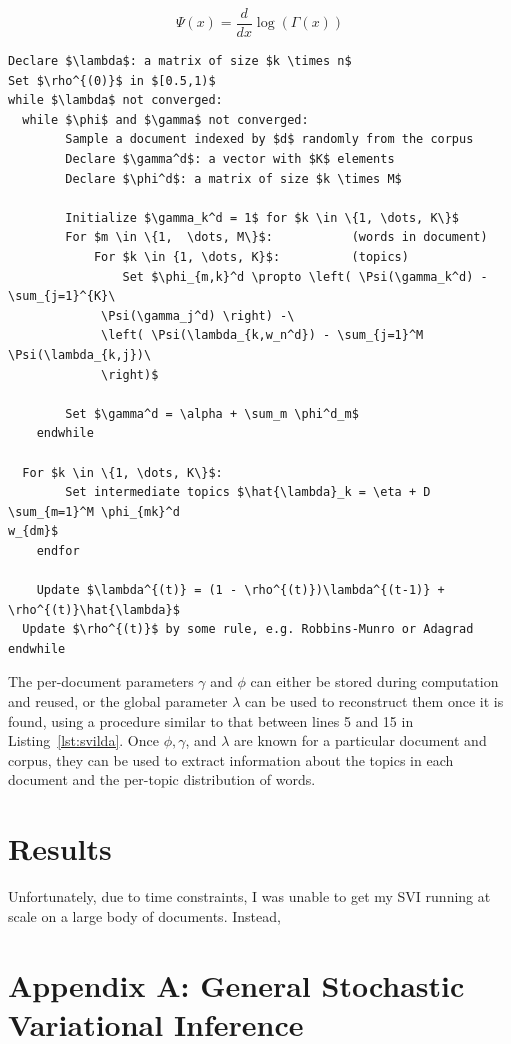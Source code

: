 \documentclass{article}
\begin{document}
\[
  \Psi(x) = \frac{d}{dx} \log \left( \Gamma(x) \right)
\]

\begin{lstlisting}[caption={The SVI-LDA algorithm},label={lst:svilda},
mathescape=true, keywords={}]
Declare $\lambda$: a matrix of size $k \times n$
Set $\rho^{(0)}$ in $[0.5,1)$
while $\lambda$ not converged:
  while $\phi$ and $\gamma$ not converged:
		Sample a document indexed by $d$ randomly from the corpus
		Declare $\gamma^d$: a vector with $K$ elements
		Declare $\phi^d$: a matrix of size $k \times M$

		Initialize $\gamma_k^d = 1$ for $k \in \{1, \dots, K\}$
		For $m \in \{1,  \dots, M\}$: 			(words in document)
			For $k \in {1, \dots, K}$: 			(topics)
				Set $\phi_{m,k}^d \propto \left( \Psi(\gamma_k^d) - \sum_{j=1}^{K}\
             \Psi(\gamma_j^d) \right) -\
             \left( \Psi(\lambda_{k,w_n^d}) - \sum_{j=1}^M \Psi(\lambda_{k,j})\
             \right)$
		
		Set $\gamma^d = \alpha + \sum_m \phi^d_m$
	endwhile

  For $k \in \{1, \dots, K\}$:
		Set intermediate topics $\hat{\lambda}_k = \eta + D \sum_{m=1}^M \phi_{mk}^d
w_{dm}$
	endfor

	Update $\lambda^{(t)} = (1 - \rho^{(t)})\lambda^{(t-1)} + \rho^{(t)}\hat{\lambda}$
  Update $\rho^{(t)}$ by some rule, e.g. Robbins-Munro or Adagrad 
endwhile

\end{lstlisting}

The per-document parameters $\gamma$ and $\phi$ can either be stored during
computation and reused, or the global parameter $\lambda$ can be used to
reconstruct them once it is found, using a procedure similar to that between
lines 5 and 15 in Listing~\ref{lst:svilda}. Once $\phi, \gamma$, and $\lambda$
are known for a particular document and corpus, they can be used to extract
information about the topics in each document and the per-topic distribution of words.

\section{Results}

Unfortunately, due to time constraints, I was unable to get my SVI running at
scale on a large body of documents. Instead, 


\newpage


\section{Appendix A: General Stochastic Variational Inference}
\end{document}
